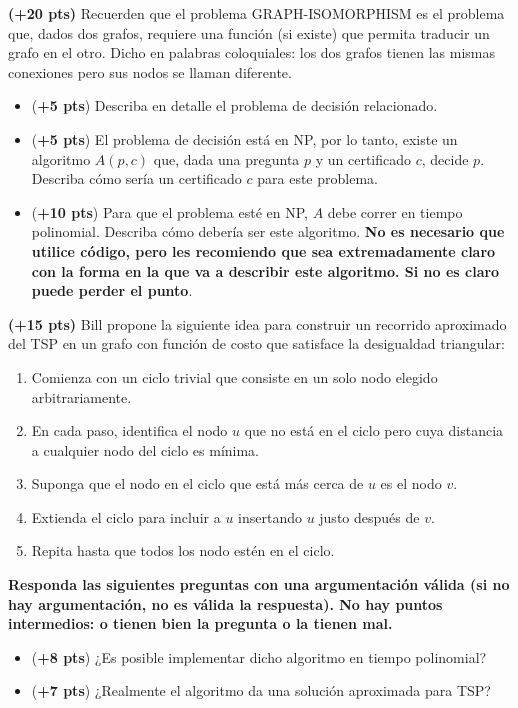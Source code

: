 \documentclass[12pt, a4paper]{exam}
\begin{document}
\begin{questions}
    \pointsdroppedatright

    \question \textbf{(+20 pts)} Recuerden que el problema GRAPH-ISOMORPHISM es el problema
    que, dados dos grafos, requiere una función (si existe) que permita traducir un grafo
    en el otro. Dicho en palabras coloquiales: los dos grafos tienen las mismas conexiones
    pero sus nodos se llaman diferente.
    \begin{itemize}
        \item (\textbf{+5 pts}) Describa en detalle el problema de decisión relacionado.

        \item (\textbf{+5 pts}) El problema de decisión está en NP, por lo tanto, existe
        un algoritmo $A(p,c)$ que, dada una pregunta $p$ y un certificado $c$, decide $p$.
        Describa cómo sería un certificado $c$ para este problema.

        \item (\textbf{+10 pts}) Para que el problema esté en NP, $A$ debe correr en
        tiempo polinomial. Describa cómo debería ser este algoritmo. \textbf{No es
        necesario que utilice código, pero les recomiendo que sea extremadamente claro con
        la forma en la que va a describir este algoritmo. Si no es claro puede perder el
        punto}.
    \end{itemize}

    \question \textbf{(+15 pts)} Bill propone la siguiente idea para construir un
    recorrido aproximado del TSP en un grafo con función de costo que satisface la
    desigualdad triangular:
    \begin{enumerate}
        \item Comienza con un ciclo trivial que consiste en un solo nodo elegido
        arbitrariamente.
        \item En cada paso, identifica el nodo $u$ que no está en el ciclo pero cuya
        distancia a cualquier nodo del ciclo es mínima.
        \item Suponga que el nodo en el ciclo que está más cerca de $u$ es el nodo $v$.
        \item Extienda el ciclo para incluir a $u$ insertando $u$ justo después de $v$.
        \item Repita hasta que todos los nodo estén en el ciclo.
    \end{enumerate}

    \textbf{Responda las siguientes preguntas con una argumentación válida (si no hay 
	argumentación, no es válida la respuesta). No hay puntos intermedios:
	 o tienen bien la pregunta o la tienen mal.}
    \begin{itemize}
        \item (\textbf{+8 pts}) ¿Es posible implementar dicho algoritmo en tiempo
        polinomial?
        \item (\textbf{+7 pts}) ¿Realmente el algoritmo da una solución aproximada para
        TSP?  
    \end{itemize}


\end{questions}
\end{document}
